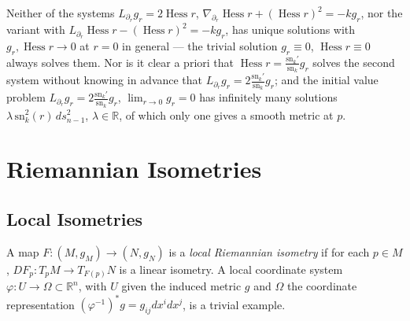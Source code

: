 \begin{remark}
  \label{rem:pet-ch5-uniqueness-remark-5-5-9}
  Neither of the systems $L_{\partial_r}g_r=2\operatorname{Hess}r$,
  $\nabla_{\partial_r}\operatorname{Hess}r+(\operatorname{Hess}r)^2=-kg_r$, nor the
  variant with $L_{\partial_r}\operatorname{Hess}r-(\operatorname{Hess}r)^2=-kg_r$,
  has unique solutions with $g_r,\operatorname{Hess}r\to0$ at $r=0$ in general — the
  trivial solution $g_r\equiv0$, $\operatorname{Hess}r\equiv0$ always solves them.
  Nor is it clear a priori that $\operatorname{Hess}r=\tfrac{\mathrm{sn}_k'}{\mathrm{sn}_k}g_r$
  solves the second system without knowing in advance that $L_{\partial_r}g_r=
  2\tfrac{\mathrm{sn}_k'}{\mathrm{sn}_k}g_r$; and the initial value problem
  $L_{\partial_r}g_r=2\tfrac{\mathrm{sn}_k'}{\mathrm{sn}_k}g_r$, $\lim_{r\to0}g_r=0$ has
  infinitely many solutions $\lambda\,\mathrm{sn}_k^2(r)\,ds_{n-1}^2$, $\lambda\in
  \mathbb R$, of which only one gives a smooth metric at $p$.
\end{remark}

\section{Riemannian Isometries}

\subsection{Local Isometries}

\begin{definition}
  \label{def:pet-ch5-local-isometry}
  \leanok
  A map $F:(M,g_M)\to(N,g_N)$ is a \emph{local Riemannian isometry} if for each
  $p\in M$, $DF_p:T_pM\to T_{F(p)}N$ is a linear isometry. A local coordinate
  system $\varphi:U\to\Omega\subset\mathbb R^n$, with $U$ given the induced metric
  $g$ and $\Omega$ the coordinate representation $(\varphi^{-1})^*g=g_{ij}dx^idx^j$,
  is a trivial example.
\end{definition}

